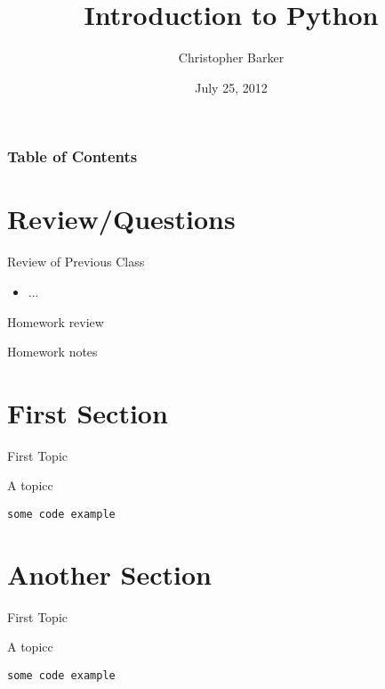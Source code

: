 \documentclass{beamer}
\title[Intro to Python: Week 5]{Introduction  to Python}
\author{Christopher Barker}
\institute{UW Continuing Education / Isilon}
\date{July 25, 2012}
\begin{document}
\begin{frame}
  \titlepage
\end{frame}

\begin{frame}
\frametitle{Table of Contents}
  \tableofcontents
\end{frame}


\section{Review/Questions}

\begin{frame}{Review of Previous Class}

\begin{itemize}
  \item ...
\end{itemize}

\end{frame}


\begin{frame}{Homework review}

  {\Large Homework notes }

\end{frame}

\section{First Section}

\begin{frame}[fragile]{First Topic}

 {\Large A topicc}

\begin{verbatim}
some code example
\end{verbatim}

\end{frame} 

\section{Another Section}

\begin{frame}[fragile]{First Topic}

 {\Large A topicc}

\begin{verbatim}
some code example
\end{verbatim}

\end{frame} 
\end{document}
